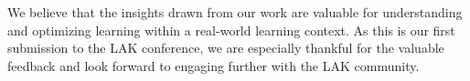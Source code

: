 \documentclass[]{article}
\begin{document}
We believe that the insights drawn from our work are valuable for understanding and optimizing learning within a real-world learning context. As this is our first submission to the LAK conference, we are especially thankful for the valuable feedback and look forward to engaging further with the LAK community. 

\end{document}
